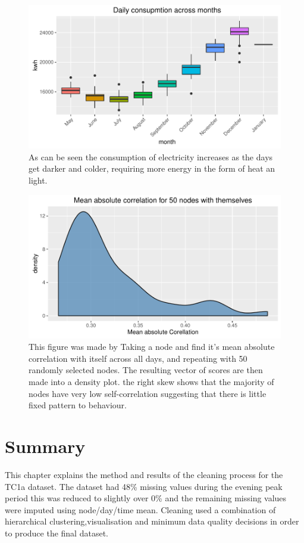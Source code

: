 \begin{figure}
    \centering
    \includegraphics[width = \textwidth]{Figures/Results/DailyConsumptionMonths}
    \caption[Daily consumption across months]{As can be seen the consumption of electricity increases as the days get darker and colder, requiring more energy in the form of heat an light.}
    \label{fig:DailyConsumption}
\end{figure}

\begin{figure}
    \centering
    \includegraphics[width = \textwidth]{Figures/Results/MeanAbsCorr}
    \caption[Node Mean absolute correlation]{This figure was made by Taking a node and find it's mean absolute correlation with itself across all days, and repeating with 50 randomly selected nodes. The resulting vector of scores are then made into a density plot. the right skew shows that the majority of nodes have very low self-correlation suggesting that there is little fixed pattern to behaviour.}
    \label{fig:MeanAbsCorr}
\end{figure}

\section{Summary}

This chapter explains the method and results of the cleaning process for the TC1a dataset. The dataset had 48\% missing values during the evening peak period this was reduced to slightly over 0\% and the remaining missing values were imputed using node/day/time mean. Cleaning used a combination of hierarchical clustering,visualisation and minimum data quality decisions in order to produce the final dataset.


